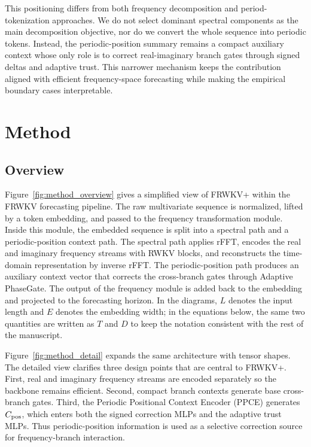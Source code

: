 \documentclass[a4paper,fleqn]{cas-sc}
\begin{document}
This positioning differs from both frequency decomposition and period-tokenization approaches. We do not select dominant spectral components as the main decomposition objective, nor do we convert the whole sequence into periodic tokens. Instead, the periodic-position summary remains a compact auxiliary context whose only role is to correct real-imaginary branch gates through signed deltas and adaptive trust. This narrower mechanism keeps the contribution aligned with efficient frequency-space forecasting while making the empirical boundary cases interpretable.

\section{Method}
\subsection{Overview}
Figure~\ref{fig:method_overview} gives a simplified view of FRWKV+ within the FRWKV forecasting pipeline. The raw multivariate sequence is normalized, lifted by a token embedding, and passed to the frequency transformation module. Inside this module, the embedded sequence is split into a spectral path and a periodic-position context path. The spectral path applies rFFT, encodes the real and imaginary frequency streams with RWKV blocks, and reconstructs the time-domain representation by inverse rFFT. The periodic-position path produces an auxiliary context vector that corrects the cross-branch gates through Adaptive PhaseGate. The output of the frequency module is added back to the embedding and projected to the forecasting horizon. In the diagrams, $L$ denotes the input length and $E$ denotes the embedding width; in the equations below, the same two quantities are written as $T$ and $D$ to keep the notation consistent with the rest of the manuscript.

Figure~\ref{fig:method_detail} expands the same architecture with tensor shapes. The detailed view clarifies three design points that are central to FRWKV+. First, real and imaginary frequency streams are encoded separately so the backbone remains efficient. Second, compact branch contexts generate base cross-branch gates. Third, the Periodic Positional Context Encoder (PPCE) generates $C_{\rm pos}$, which enters both the signed correction MLPs and the adaptive trust MLPs. Thus periodic-position information is used as a selective correction source for frequency-branch interaction.
\end{document}
